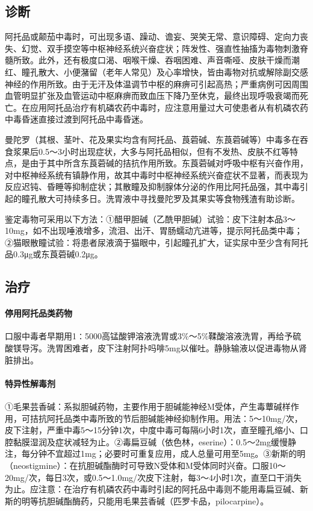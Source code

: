 \subsection{诊断}

阿托品或颠茄中毒时，可出现多语、躁动、谵妄、哭笑无常、意识障碍、定向力丧失、幻觉、双手摸空等中枢神经系统兴奋症状；阵发性、强直性抽搐为毒物刺激脊髓所致。此外，还有极度口渴、咽喉干燥、吞咽困难、声音嘶哑、皮肤干燥而潮红、瞳孔散大、小便潴留（老年人常见）及心率增快，皆由毒物对抗或解除副交感神经的作用所致。由于无汗及体温调节中枢的麻痹可引起高热；严重病例可因周围血管明显扩张及血管运动中枢麻痹而致血压下降乃至休克，最终出现呼吸衰竭而死亡。在应用阿托品治疗有机磷农药中毒时，应注意用量过大可使患者从有机磷农药中毒昏迷直接过渡到阿托品中毒昏迷。

曼陀罗（其根、茎叶、花及果实均含有阿托品、莨菪碱、东莨菪碱等）中毒多在吞食浆果后0.5～3小时出现症状，大多与阿托品相似，但有不发热、皮肤不红等特点，是由于其中所含东莨菪碱的拮抗作用所致。东莨菪碱对呼吸中枢有兴奋作用，对中枢神经系统有镇静作用，故其中毒时中枢神经系统兴奋症状不显著，而表现为反应迟钝、昏睡等抑制症状；其散瞳及抑制腺体分泌的作用比阿托品强，其中毒引起的瞳孔散大可持续多日。洗胃液中寻找曼陀罗及其果实等食物残渣有助诊断。

鉴定毒物可采用以下方法：①醋甲胆碱（乙酰甲胆碱）试验：皮下注射本品3～10mg，如不出现唾液增多，流泪、出汗、胃肠蠕动亢进等，提示阿托品类中毒；②猫眼散瞳试验：将患者尿液滴于猫眼中，引起瞳孔扩大，证实尿中至少含有阿托品0.3μg或东莨菪碱0.2μg。

\subsection{治疗}

\paragraph{停用阿托品类药物}

口服中毒者早期用1∶5000高锰酸钾溶液洗胃或3\%～5\%鞣酸溶液洗胃，再给予硫酸镁导泻。洗胃困难者，皮下注射阿扑吗啡5mg以催吐。静脉输液以促进毒物从肾脏排出。

\paragraph{特异性解毒剂}

①毛果芸香碱：系拟胆碱药物，主要作用于胆碱能神经M受体，产生毒蕈碱样作用，可拮抗阿托品类中毒所致的节后胆碱能神经抑制作用。用法：5～10mg/次，皮下注射，严重中毒5～15分钟1次，中度中毒可每隔6小时1次，直至瞳孔缩小、口腔黏膜湿润及症状减轻为止。②毒扁豆碱（依色林，eserine）：0.5～2mg缓慢静注，每分钟不宜超过1mg；必要时可重复应用，成人总量可用至5mg。③新斯的明（neostigmine）：在抗胆碱酯酶时可导致N受体和M受体同时兴奋。口服10～20mg/次，每日3次，或0.5～1.0mg/次皮下注射，每3～4小时1次，直至口干消失为止。应注意：在治疗有机磷农药中毒时引起的阿托品中毒则不能用毒扁豆碱、新斯的明等抗胆碱酯酶药，只能用毛果芸香碱（匹罗卡品，pilocarpine）。

